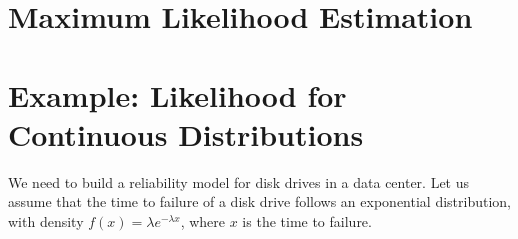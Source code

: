 \documentclass[10pt]{article}
\begin{document}






\section*{Maximum Likelihood Estimation}
\section*{Example: Likelihood for Continuous Distributions}
We need to build a reliability model for disk drives in a data center. Let us assume that the time to failure of a disk drive follows an exponential distribution, with density $f(x)=\lambda e^{-\lambda x}$, where $x$ is the time to failure.
\end{document}
